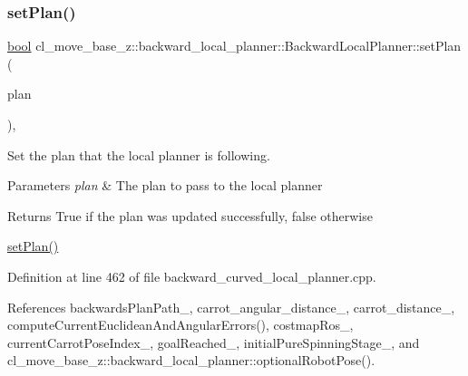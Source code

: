 \mbox{\label{classcl__move__base__z_1_1backward__local__planner_1_1BackwardLocalPlanner_ab11a0eec45f24b5a5a3987a50427eed4}} 
\subsubsection{\texorpdfstring{set\+Plan()}{setPlan()}}
{\footnotesize\ttfamily \hyperlink{classbool}{bool} cl\+\_\+move\+\_\+base\+\_\+z\+::backward\+\_\+local\+\_\+planner\+::\+Backward\+Local\+Planner\+::set\+Plan (\begin{DoxyParamCaption}\item[{const std\+::vector$<$ geometry\+\_\+msgs\+::\+Pose\+Stamped $>$ \&}]{plan }\end{DoxyParamCaption})\hspace{0.3cm}{\ttfamily [override]}, {\ttfamily [virtual]}}



Set the plan that the local planner is following. 


\begin{DoxyParams}{Parameters}
{\em plan} & The plan to pass to the local planner \\
\hline
\end{DoxyParams}
\begin{DoxyReturn}{Returns}
True if the plan was updated successfully, false otherwise
\end{DoxyReturn}
\hyperlink{classcl__move__base__z_1_1backward__local__planner_1_1BackwardLocalPlanner_ab11a0eec45f24b5a5a3987a50427eed4}{set\+Plan()} 

Definition at line 462 of file backward\+\_\+curved\+\_\+local\+\_\+planner.\+cpp.



References backwards\+Plan\+Path\+\_\+, carrot\+\_\+angular\+\_\+distance\+\_\+, carrot\+\_\+distance\+\_\+, compute\+Current\+Euclidean\+And\+Angular\+Errors(), costmap\+Ros\+\_\+, current\+Carrot\+Pose\+Index\+\_\+, goal\+Reached\+\_\+, initial\+Pure\+Spinning\+Stage\+\_\+, and cl\+\_\+move\+\_\+base\+\_\+z\+::backward\+\_\+local\+\_\+planner\+::optional\+Robot\+Pose().


